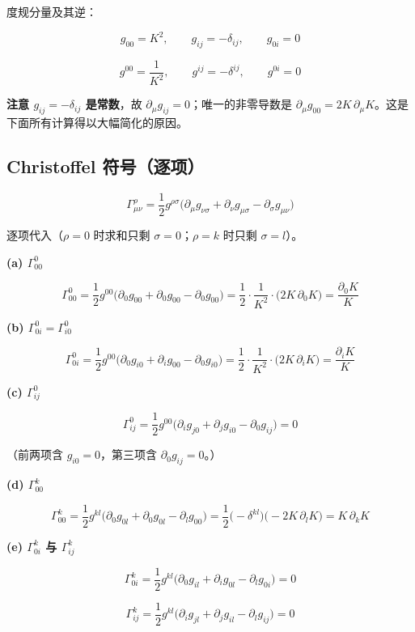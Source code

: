\documentclass[
  chinese,
  a4paper,
  UTF8,
  12pt,
  oneside,
  openany]{ctexbook}
\theoremstyle{plain}
\theoremstyle{plain}
\theoremstyle{plain}
\theoremstyle{definition}
\theoremstyle{plain}
\theoremstyle{plain}
\theoremstyle{remark}
\begin{document}
度规分量及其逆：

\[
g_{00}=K^{2},\qquad g_{ij}=-\delta_{ij},\qquad g_{0i}=0
\]

\[
g^{00}=\frac{1}{K^{2}},\qquad g^{ij}=-\delta^{ij},\qquad g^{0i}=0
\]

\textbf{注意 \(g_{ij}=-\delta_{ij}\) 是常数}，故
\(\partial_\mu g_{ij}=0\)；唯一的非零导数是
\(\partial_\mu g_{00}=2K\,\partial_\mu K\)。这是下面所有计算得以大幅简化的原因。

\subsection{Christoffel
符号（逐项）}\label{christoffel-ux7b26ux53f7ux9010ux9879}

\[
\Gamma^{\rho}_{\mu\nu}=\frac{1}{2}g^{\rho\sigma}
\bigl(\partial_\mu g_{\nu\sigma}+\partial_\nu g_{\mu\sigma}-\partial_\sigma g_{\mu\nu}\bigr)
\]

逐项代入（\(\rho=0\) 时求和只剩 \(\sigma=0\)；\(\rho=k\) 时只剩
\(\sigma=l\)）。

\textbf{(a) \(\Gamma^{0}_{00}\)}

\[
\Gamma^{0}_{00}=\frac{1}{2}g^{00}\bigl(\partial_0g_{00}+\partial_0g_{00}-\partial_0g_{00}\bigr)
=\frac{1}{2}\cdot\frac{1}{K^{2}}\cdot\bigl(2K\,\partial_0K\bigr)
=\frac{\partial_0K}{K}
\]

\textbf{(b) \(\Gamma^{0}_{0i}=\Gamma^{0}_{i0}\)}

\[
\Gamma^{0}_{0i}=\frac{1}{2}g^{00}\bigl(\partial_0g_{i0}+\partial_ig_{00}-\partial_0g_{i0}\bigr)
=\frac{1}{2}\cdot\frac{1}{K^{2}}\cdot\bigl(2K\,\partial_iK\bigr)
=\frac{\partial_iK}{K}
\]

\textbf{(c) \(\Gamma^{0}_{ij}\)}

\[
\Gamma^{0}_{ij}=\frac{1}{2}g^{00}\bigl(\partial_ig_{j0}+\partial_jg_{i0}-\partial_0g_{ij}\bigr)=0
\]

（前两项含 \(g_{i0}=0\)，第三项含 \(\partial_0g_{ij}=0\)。）

\textbf{(d) \(\Gamma^{k}_{00}\)}

\[
\Gamma^{k}_{00}=\frac{1}{2}g^{kl}\bigl(\partial_0g_{0l}+\partial_0g_{0l}-\partial_lg_{00}\bigr)
=\frac{1}{2}\bigl(-\delta^{kl}\bigr)\bigl(-2K\,\partial_lK\bigr)
=K\,\partial_kK
\]

\textbf{(e) \(\Gamma^{k}_{0i}\) 与 \(\Gamma^{k}_{ij}\)}

\[
\Gamma^{k}_{0i}=\frac{1}{2}g^{kl}\bigl(\partial_0g_{il}+\partial_ig_{0l}-\partial_lg_{0i}\bigr)=0
\]

\[
\Gamma^{k}_{ij}=\frac{1}{2}g^{kl}\bigl(\partial_ig_{jl}+\partial_jg_{il}-\partial_lg_{ij}\bigr)=0
\]
\end{document}
